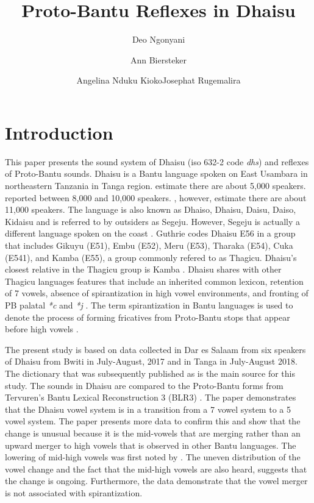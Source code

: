 \documentclass[output=paper,colorlinks,citecolor=brown]{langscibook}
\author{Deo Ngonyani\affiliation{Michigan State University}\and Ann Biersteker\affiliation{Michigan State University}\and Angelina Nduku Kioko\affiliation{US International University-Africa}\lastand  Josephat Rugemalira\affiliation{Tumaini University Dar es Salaam College}}
\title{Proto-Bantu Reflexes in Dhaisu}
\begin{document}
\maketitle

\section{Introduction}\label{sec:ngonyani:1}

This paper presents the sound system of Dhaisu (iso 632-2 code \textit{dhs}) and reflexes of Proto-Bantu sounds. Dhaisu is a Bantu language spoken on East Usambara in northeastern Tanzania in Tanga region. \cite{SimonsFennig2017} estimate there are about 5,000 speakers. \cite[17]{Nurse2000} reported between 8,000 and 10,000 speakers. \cite[2]{RugemaliraEtAl2019}, however, estimate there are about 11,000 speakers. The language is also known as Dhaiso, Dhaisu, Daisu, Daiso, Kidaisu and is referred to by outsiders as Segeju. However, Segeju is actually a different language spoken on the coast \citep{Nurse1982}. Guthrie codes Dhaisu E56 \citep{Guthrie1967, Maho2009} in a group that includes Gikuyu (E51), Embu (E52), Meru (E53), Tharaka (E54), Cuka (E541), and Kamba (E55), a group commonly refered to as Thagicu. Dhaisu's closest relative in the Thagicu group is Kamba \citep{Nurse1982, Nurse2000, Nurse1999}. Dhaisu shares with other Thagicu languages features that include an inherited common lexicon, retention of 7 vowels, absence of spirantization in high vowel environments, and fronting of PB palatal \textit{*c} and \textit{*j} \citep{Nurse1982}. The term spirantization in Bantu languages is used to denote the process of forming fricatives from Proto-Bantu stops that appear before high vowels  \citep{Nurse1982, Schadeberg1995}. 

The present study is based on data collected in Dar es Salaam from six  speakers of Dhaisu from Bwiti in July-August, 2017 and in Tanga in July-August 2018. The dictionary that was subsequently published as \cite{RugemaliraEtAl2019} is the main source for this study. The sounds in Dhaisu are compared to the Proto-Bantu forms from Tervuren's Bantu Lexical Reconstruction 3 (BLR3) \citep{BastinEtAl2002}. The paper demonstrates that the Dhaisu vowel system is in a transition from a 7 vowel system to a 5 vowel system. The paper presents more data to confirm this and show that the change is unusual because it is the mid-vowels that are merging rather than an upward merger to high vowels that is observed in other Bantu languages. The lowering of mid-high vowels was first noted by \cite{Nurse2000}. The uneven distribution of the vowel change and the fact that the mid-high vowels are also heard, suggests that the change is ongoing. Furthermore, the data demonstrate that the vowel merger is not associated with spirantization.
\end{document}
